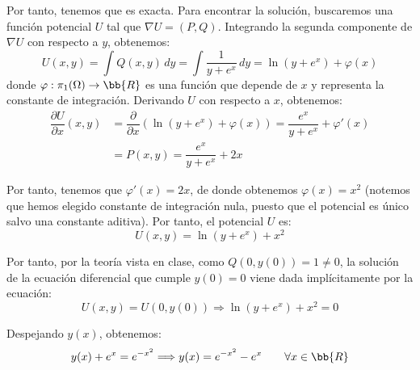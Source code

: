 \documentclass[12pt]{article}
\begin{document}
\begin{ejercicio}
        Por tanto, tenemos que es exacta. Para encontrar la solución, buscaremos una función potencial $U$ tal que $\nabla U = (P,Q)$.
        Integrando la segunda componente de $\nabla U$ con respecto a $y$, obtenemos:
        \begin{equation*}
            U(x,y) = \int Q(x,y)\,dy = \int \dfrac{1}{y+e^x}\,dy = \ln(y+e^x) + \varphi(x)
        \end{equation*}
        donde $\varphi:\pi_1(\Omega)\to\bb{R}$ es una función que depende de $x$ y representa la constante de integración. Derivando $U$ con respecto a $x$, obtenemos:
        \begin{align*}
            \dfrac{\partial U}{\partial x}(x,y) &= \dfrac{\partial}{\partial x}(\ln(y+e^x) + \varphi(x)) = \dfrac{e^x}{y+e^x} + \varphi'(x)\\
            &= P(x,y) = \dfrac{e^x}{y+e^x} + 2x
        \end{align*}

        Por tanto, tenemos que $\varphi'(x) = 2x$, de donde obtenemos $\varphi(x) = x^2$ (notemos que hemos elegido constante de integración nula, puesto que el potencial es único salvo una constante aditiva).
        Por tanto, el potencial $U$ es:
        \begin{equation*}
            U(x,y) = \ln(y+e^x) + x^2
        \end{equation*}

        Por tanto, por la teoría vista en clase, como $Q(0,y(0))=1\neq 0$, la solución de la ecuación diferencial que cumple $y(0)=0$ viene dada implícitamente por la ecuación:
        \begin{equation*}
            U(x,y) = U(0,y(0))\Longrightarrow
            \ln(y+e^x) + x^2 = 0
        \end{equation*}

        Despejando $y(x)$, obtenemos:
        \begin{equation*}
            y(x)+e^x = e^{-x^2}\Longrightarrow y(x) = e^{-x^2}-e^x\qquad \forall x\in\bb{R}
        \end{equation*}
    \end{ejercicio}
\end{document}
